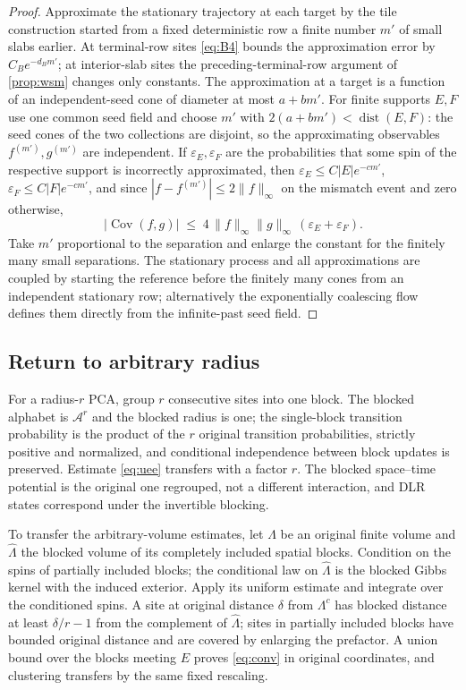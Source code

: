 \documentclass[11pt]{article}
\theoremstyle{plain}
\theoremstyle{definition}
\theoremstyle{remark}
\newcommand{\A}{\mathcal{A}}
\newcommand{\Lam}{\Lambda}
\newcommand{\eps}{\varepsilon}
\newcommand{\dist}{\operatorname{dist}}
\newcommand{\Cov}{\operatorname{Cov}}
\begin{document}
\begin{proof}
Approximate the stationary trajectory at each target by the tile construction started from a fixed deterministic row a finite number $m'$ of small slabs earlier. At terminal-row sites \eqref{eq:B4} bounds the approximation error by $C_Be^{-d_Bm'}$; at interior-slab sites the preceding-terminal-row argument of \cref{prop:wsm} changes only constants. The approximation at a target is a function of an independent-seed cone of diameter at most $a+bm'$. For finite supports $E,F$ use one common seed field and choose $m'$ with $2(a+bm')<\dist(E,F)$: the seed cones of the two collections are disjoint, so the approximating observables $f^{(m')},g^{(m')}$ are independent. If $\eps_E,\eps_F$ are the probabilities that some spin of the respective support is incorrectly approximated, then $\eps_E\le C|E|e^{-cm'}$, $\eps_F\le C|F|e^{-cm'}$, and since $|f-f^{(m')}|\le2\|f\|_\infty$ on the mismatch event and zero otherwise,
\[
|\Cov(f,g)|\;\le\;4\,\|f\|_\infty\|g\|_\infty\,(\eps_E+\eps_F).
\]
Take $m'$ proportional to the separation and enlarge the constant for the finitely many small separations. The stationary process and all approximations are coupled by starting the reference before the finitely many cones from an independent stationary row; alternatively the exponentially coalescing flow defines them directly from the infinite-past seed field.
\end{proof}

\subsection{Return to arbitrary radius}
\label{sec:blocking}

For a radius-$r$ PCA, group $r$ consecutive sites into one block. The blocked alphabet is $\A^r$ and the blocked radius is one; the single-block transition probability is the product of the $r$ original transition probabilities, strictly positive and normalized, and conditional independence between block updates is preserved. Estimate \eqref{eq:uee} transfers with a factor $r$. The blocked space--time potential is the original one regrouped, not a different interaction, and DLR states correspond under the invertible blocking.

To transfer the arbitrary-volume estimates, let $\Lam$ be an original finite volume and $\hat\Lam$ the blocked volume of its completely included spatial blocks. Condition on the spins of partially included blocks; the conditional law on $\hat\Lam$ is the blocked Gibbs kernel with the induced exterior. Apply its uniform estimate and integrate over the conditioned spins. A site at original distance $\delta$ from $\Lam^c$ has blocked distance at least $\delta/r-1$ from the complement of $\hat\Lam$; sites in partially included blocks have bounded original distance and are covered by enlarging the prefactor. A union bound over the blocks meeting $E$ proves \eqref{eq:conv} in original coordinates, and clustering transfers by the same fixed rescaling.
\end{document}

